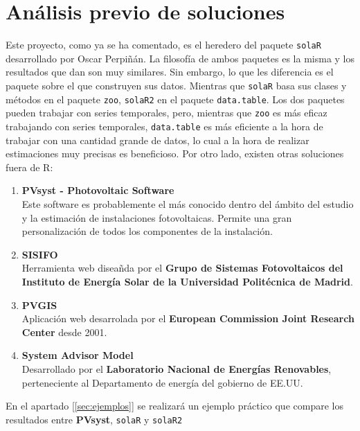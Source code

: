 \section{Análisis previo de soluciones}
\label{sec:org1e889c3}
Este proyecto, como ya se ha comentado, es el heredero del paquete \texttt{solaR} desarrollado por Oscar Perpiñán. La filosofía de ambos paquetes es la misma y los resultados que dan son muy similares. Sin embargo, lo que les diferencia es el paquete sobre el que construyen sus datos.
Mientras que \texttt{solaR} basa sus clases y métodos en el paquete \texttt{zoo}, \texttt{solaR2} en el paquete \texttt{data.table}. Los dos paquetes pueden trabajar con series temporales, pero, mientras que \texttt{zoo} es más eficaz trabajando con series temporales, \texttt{data.table} es más eficiente a la hora de trabajar con una cantidad grande de datos, lo cual a la hora de realizar estimaciones muy precisas es beneficioso.
Por otro lado, existen otras soluciones fuera de R:
\begin{enumerate}
\item \textbf{PVsyst - Photovoltaic Software}\\[0pt]
Este software es probablemente el más conocido dentro del ámbito del estudio y la estimación de instalaciones fotovoltaicas. Permite una gran personalización de todos los componentes de la instalación.
\item \textbf{SISIFO}\\[0pt]
Herramienta web diseañda por el \textbf{Grupo de Sistemas Fotovoltaicos del Instituto de Energía Solar de la Universidad Politécnica de Madrid}.
\item \textbf{PVGIS}\\[0pt]
Aplicación web desarrolada por el \textbf{European Commission Joint Research Center} desde 2001.
\item \textbf{System Advisor Model}\\[0pt]
Desarrollado por el \textbf{Laboratorio Nacional de Energías Renovables}, perteneciente al Departamento de energía del gobierno de EE.UU.
\end{enumerate}
En el apartado [\ref{sec:ejemplos}] se realizará un ejemplo práctico que compare los resultados entre \textbf{PVsyst}, \texttt{solaR} y \texttt{solaR2}
